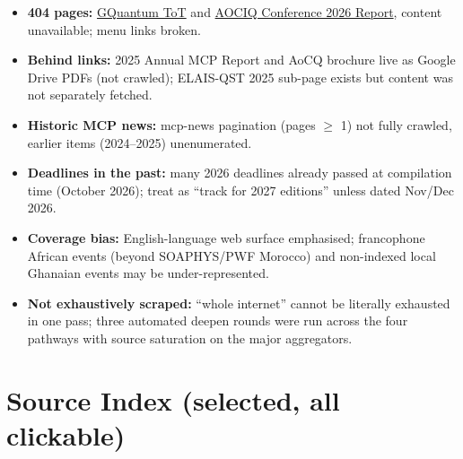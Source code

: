 \documentclass[11pt,a4paper]{article}
\begin{document}
\begin{itemize}[leftmargin=1.4em]
  \item \textbf{404 pages:} \href{https://physics.knust.edu.gh/mcp/GQuantum-ToT}{GQuantum ToT} and \href{https://physics.knust.edu.gh/aociq-conference-2026-report}{AOCIQ Conference 2026 Report}, content unavailable; menu links broken.
  \item \textbf{Behind links:} 2025 Annual MCP Report and AoC\textbar Q brochure live as Google Drive PDFs (not crawled); ELAIS-QST 2025 sub-page exists but content was not separately fetched.
  \item \textbf{Historic MCP news:} mcp-news pagination (pages $\geq$ 1) not fully crawled, earlier items (2024--2025) unenumerated.
  \item \textbf{Deadlines in the past:} many 2026 deadlines already passed at compilation time (October 2026); treat as ``track for 2027 editions'' unless dated Nov/Dec 2026.
  \item \textbf{Coverage bias:} English-language web surface emphasised; francophone African events (beyond SOAPHYS/PWF Morocco) and non-indexed local Ghanaian events may be under-represented.
  \item \textbf{Not exhaustively scraped:} ``whole internet'' cannot be literally exhausted in one pass; three automated deepen rounds were run across the four pathways with source saturation on the major aggregators.
\end{itemize}

\section{Source Index (selected, all clickable)}
\end{document}
